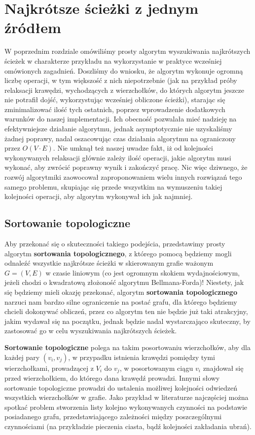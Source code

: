 \chapter{Najkrótsze ścieżki z jednym źródłem}

W poprzednim rozdziale omówiliśmy prosty algorytm wyszukiwania najkrótszych ścieżek w charakterze przykładu na wykorzystanie w praktyce wcześniej omówionych zagadnień. Doszliśmy do wniosku, że algorytm wykonuje ogromną liczbę operacji, w tym większość z nich niepotrzebnie (jak na przykład próby relaksacji krawędzi, wychodzących z wierzchołków, do których algorytm jeszcze nie potrafił dojść, wykorzystując wcześniej obliczone ścieżki), starając się zminimalizować ilość tych ostatnich, poprzez wprowadzenie dodatkowych warunków do naszej implementacji. Ich obecność pozwalała mieć nadzieję na efektywniejsze działanie algorytmu, jednak asymptotycznie nie uzyskaliśmy żadnej poprawy, nadal oszacowując czas działania algorytmu na ograniczony przez $O \left( V \cdot E \right)$. Nie umknął też naszej uwadze fakt, iż od kolejności wykonywanych relaksacji głównie zależy ilość operacji, jakie algorytm musi wykonać, aby zwrócić poprawny wynik i zakończyć pracę. Nic więc dziwnego, że rozwój algorytmiki zaowocował zaproponowaniem wielu innych rozwiązań tego samego problemu, skupiając się przede wszystkim na wymuszeniu takiej kolejności operacji, aby algorytm wykonywał ich jak najmniej.

\section{Sortowanie topologiczne}

Aby przekonać się o skuteczności takiego podejścia, przedstawimy prosty algorytm \textbf{sortowania topologicznego}, z którego pomocą będziemy mogli odnaleźć wszystkie najkrótsze ścieżki w skierowanym grafie ważonym $G = \left( V, E \right)$ w czasie liniowym (co jest ogromnym skokiem wydajnościowym, jeżeli chodzi o kwadratową złożoność algorytmu Bellmana-Forda)! Niestety, jak się będziemy mieli okazję przekonać, algorytm \textbf{sortowania topologicznego} narzuci nam bardzo silne ograniczenie na postać grafu, dla którego będziemy chcieli dokonywać obliczeń, przez co algorytm ten nie będzie już taki atrakcyjny, jakim wydawał się na początku, jednak będzie nadal wystarczająco skuteczny, by zastosować go w celu wyszukiwania najkrótszych ścieżek.

\textbf{Sortowanie topologiczne} polega na takim posortowaniu wierzchołków, aby dla każdej pary $ \left( v_{i}, v_{j} \right)$, w przypadku istnienia krawędzi pomiędzy tymi wierzchołkami, prowadzącej z $V_{i}$ do $v_{j}$, w posortowanym ciągu $v_{i}$ znajdował się przed wierzchołkiem, do którego dana krawędź prowadzi. Innymi słowy sortowanie topologiczne prowadzi do ustalenia możliwej kolejności odwiedzeń wszystkich wierzchołków w grafie. Jako przykład w literaturze najczęściej można spotkać problem stworzenia listy kolejno wykonywanych czynności na podstawie posiadanego grafu, przedstawiającego zależności między poszczególnymi czynnościami (na przykładzie pieczenia ciasta, bądź kolejności zakładania ubrań). 

